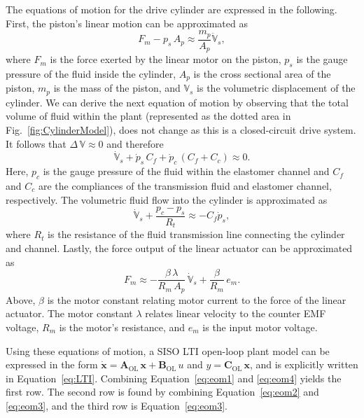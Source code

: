 The equations of motion for the drive cylinder are expressed in the following. First, the piston's linear motion can be approximated as
\begin{equation}\label{eq:eom1}
    F_m - p_s \, A_p \approx \frac{m_p}{A_p} \ddot{\mathbb{V}}_s,
\end{equation}
where $F_m$ is the force exerted by the linear motor on the piston, $p_s$ is the gauge pressure of the fluid inside the cylinder, $A_p$ is the cross sectional area of the piston, $m_p$ is the mass of the piston, and $\mathbb{V}_s$ is the volumetric displacement of the cylinder.
We can derive the next equation of motion by observing that the total volume of fluid within the plant (represented as the dotted area in Fig.~\ref{fig:CylinderModel}), does not change as this is a closed-circuit drive system.
It follows that $\Delta \, \mathbb{V} \approx 0$ and therefore
\begin{equation}\label{eq:eom2}
    \dot{\mathbb{V}}_s + \dot{p}_s \, C_f + \dot{p}_c \, \left( C_f + C_c \right) \approx 0.
\end{equation}
Here, $p_c$ is the gauge pressure of the fluid within the elastomer channel and $C_f$ and $C_c$ are the compliances of the transmission fluid and elastomer channel, respectively. The volumetric fluid flow into the cylinder is approximated as
\begin{equation}\label{eq:eom3}
    \dot{\mathbb{V}}_s + \frac{p_c - p_s}{R_t} \approx -C_f \dot{p}_s,
\end{equation}
where $R_t$ is the resistance of the fluid transmission line connecting the cylinder and channel. Lastly, the force output of the linear actuator can be approximated as
\begin{equation}\label{eq:eom4}
    F_m \approx - \frac{\beta \, \lambda}{R_m \, A_p} \, \dot{\mathbb{V}}_s + \frac{\beta}{R_m} \, e_m.
\end{equation}
Above, $\beta$ is the motor constant relating motor current to the force of the linear actuator. The motor constant $\lambda$ relates linear velocity to the counter EMF voltage, $R_m$ is the motor's resistance, and $e_m$ is the input motor voltage.

Using these equations of motion, a SISO LTI open-loop plant model can be expressed in the form
$\dot{\mathbf{x}} = \mathbf{A}_{\text{OL}}\,\mathbf{x} + \mathbf{B}_{\text{OL}}\, u$ and
$y = \mathbf{C}_{\text{OL}}\,\mathbf{x}$,
and is explicitly written in Equation~\ref{eq:LTI}.
Combining Equation~\ref{eq:eom1} and \ref{eq:eom4} yields the first row.
The second row is found by combining Equation~\ref{eq:eom2} and \ref{eq:eom3}, and the third row is Equation~\ref{eq:eom3}.

